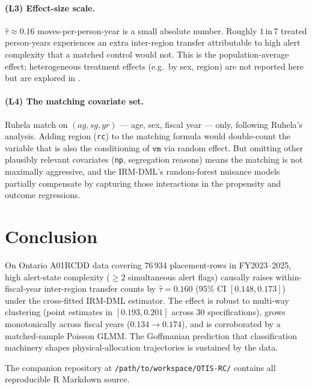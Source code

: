 \documentclass[11pt,a4paper]{article}
\newcommand{\1}{\mathbf{1}}
\theoremstyle{plain}
\theoremstyle{definition}
\begin{document}
\paragraph{(L3) Effect-size scale.}  $\hat\tau \approx 0.16$
moves-per-person-year is a small absolute number.  Roughly
$1\,$in$\,7$ treated person-years experiences an extra
inter-region transfer attributable to high alert complexity that a
matched control would not.  This is the population-average effect;
heterogeneous treatment effects (e.g.\ by sex, region) are not
reported here but are explored in
\cite[notez1a.qmd]{ruhela2026otisrc}.

\paragraph{(L4) The matching covariate set.}  Ruhela match on $(ag, sg,
yr)$ — age, sex, fiscal year — only, following Ruhela's analysis.
Adding region (\texttt{rc}) to the matching formula would
double-count the variable that is also the conditioning of
$\texttt{vm}$ via random effect.  But omitting other plausibly
relevant covariates (\texttt{np}, segregation reasons) means the
matching is not maximally aggressive, and the IRM-DML's
random-forest nuisance models partially compensate by capturing
those interactions in the propensity and outcome regressions.

\section{Conclusion}\label{sec:conclusion}

On Ontario A01RCDD data covering $76\,934$ placement-rows in
FY2023--2025, high alert-state complexity ($\ge 2$ simultaneous
alert flags) causally raises within-fiscal-year inter-region
transfer counts by $\widehat\tau = 0.160$ ($95\% \text{ CI }[0.148,
0.173]$) under the cross-fitted IRM-DML estimator.  The effect is
robust to multi-way clustering (point estimates in $[0.193, 0.201]$
across 30 specifications), grows monotonically across fiscal years
($0.134 \to 0.174$), and is corroborated by a matched-sample
Poisson GLMM.  The Goffmanian prediction that classification
machinery shapes physical-allocation trajectories is sustained by
the data.

The companion repository at
\texttt{/path/to/workspace/OTIS-RC/} contains all
reproducible R Markdown source.
\end{document}

